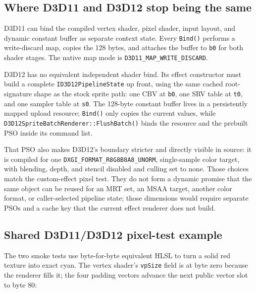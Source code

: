 \subsection{Where D3D11 and D3D12 stop being the same}

D3D11 can bind the compiled vertex shader, pixel shader, input layout, and dynamic constant
buffer as separate context state. Every \texttt{Bind()} performs a write-discard map, copies
the 128 bytes, and attaches the buffer to \texttt{b0} for both shader stages. The native map
mode is \texttt{D3D11\_MAP\_WRITE\_DISCARD}.

D3D12 has no equivalent independent shader bind. Its effect constructor must build a complete
\texttt{ID3D12PipelineState} up front, using the same cached root-signature shape as the stock
sprite path: one CBV at \texttt{b0}, one SRV table at \texttt{t0}, and one sampler table at
\texttt{s0}. The 128-byte constant buffer lives in a persistently mapped upload resource;
\texttt{Bind()} only copies the current values, while
\texttt{D3D12SpriteBatchRenderer::FlushBatch()} binds the resource and the prebuilt PSO inside
its command list.

That PSO also makes D3D12's boundary stricter and directly visible in source: it is compiled
for one \texttt{DXGI\_FORMAT\_R8G8B8A8\_UNORM}, single-sample color target, with blending,
depth, and stencil disabled and culling set to none. Those choices match the custom-effect
pixel test. They do not form a dynamic promise that the same object can be reused for an MRT
set, an MSAA target, another color format, or caller-selected pipeline state; those dimensions
would require separate PSOs and a cache key that the current effect renderer does not build.

\subsection{Shared D3D11/D3D12 pixel-test example}

The two smoke tests use byte-for-byte equivalent HLSL to turn a solid red texture into exact
cyan. The vertex shader's \texttt{vpSize} field is at byte zero because the renderer fills it;
the four padding vectors advance the next public vector slot to byte 80:

